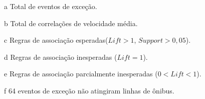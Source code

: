 \documentclass[
	12pt,				%
	oneside,			%
	a4paper,			%
	english,			%
	brazil				%
	]{abntex2ppgsi}
\begin{document}
{{\begin{apendicesenv}
\begin{table}[!htb]
\begin{threeparttable}
\begin{tablenotes}
            \item[a] Total de eventos de exceção.
            \item[b] Total de correlações de velocidade média.
            \item[c] Regras de associação esperadas($Lift > 1$, $Support > 0,05$).
            \item[d] Regras de associação inesperadas ($Lift = 1$).
            \item[e] Regras de associação parcialmente inesperadas ($0 < Lift < 1$).
            \item[f] 64 eventos de exceção não atingiram linhas de ônibus.
        \end{tablenotes}
\end{threeparttable}
\end{table}



\end{apendicesenv}}}
\end{document}

